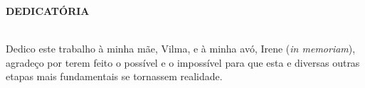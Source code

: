 \begin{center}
\textbf{DEDICATÓRIA}
\end{center}

$\!$\\


Dedico este trabalho à minha mãe, Vilma, e à minha avó, Irene (\textit{in memoriam}), agradeço por terem feito o possível e o impossível para que esta e diversas outras etapas mais fundamentais se tornassem realidade.